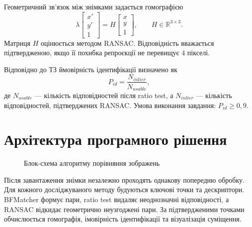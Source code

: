 \documentclass[12pt,a4paper]{article}
\begin{document}
Геометричний зв'язок між знімками задається гомографією
\begin{equation}
\lambda
\begin{bmatrix}x'\\y'\\1\end{bmatrix}
=H
\begin{bmatrix}x\\y\\1\end{bmatrix},
\qquad H\in\mathbb{R}^{3\times3}.
\end{equation}
Матриця $H$ оцінюється методом RANSAC. Відповідність вважається підтвердженою, якщо її похибка репроєкції не перевищує 4 пікселі.

Відповідно до ТЗ ймовірність ідентифікації визначено як
\begin{equation}
P_{id}=\frac{N_{inlier}}{N_{usable}},
\end{equation}
де $N_{usable}$ --- кількість відповідностей після ratio test, а $N_{inlier}$ --- кількість відповідностей, підтверджених RANSAC. Умова виконання завдання: $P_{id}\geq0{,}9$.

\section{Архітектура програмного рішення}
\begin{figure}[H]\centering
{}
\caption{Блок-схема алгоритму порівняння зображень}
\end{figure}

Після завантаження знімки незалежно проходять однакову попередню обробку. Для кожного досліджуваного методу будуються ключові точки та дескриптори. BFMatcher формує пари, ratio test видаляє неоднозначні відповідності, а RANSAC відкидає геометрично неузгоджені пари. За підтвердженими точками обчислюється гомографія, імовірність ідентифікації та візуалізація суміщення.
\end{document}
